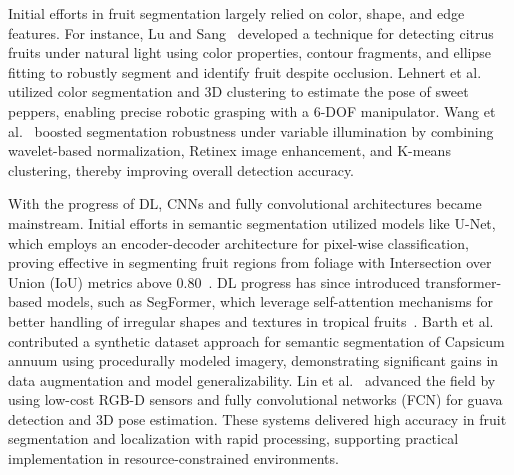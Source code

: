 \documentclass[a4paper,fleqn]{cas-dc}
\begin{document}
Initial efforts in fruit segmentation largely relied on color, shape, and edge features.
For instance, Lu and Sang~\cite{lu2015detecting} developed a technique for detecting citrus fruits under natural light using color properties, contour fragments, and ellipse fitting to robustly segment and identify fruit despite occlusion. 
Lehnert et al.~\cite{lehnert2016sweet} utilized color segmentation and 3D clustering to estimate the pose of sweet peppers, enabling precise robotic grasping with a 6-DOF manipulator. 
Wang et al.~\cite{wang2017robust} boosted segmentation robustness under variable illumination by combining wavelet-based normalization, Retinex image enhancement, and K-means clustering, thereby improving overall detection accuracy.

With the progress of DL, CNNs and fully convolutional architectures became mainstream. Initial efforts in semantic segmentation utilized models like U-Net, which employs an encoder-decoder architecture for pixel-wise classification, proving effective in segmenting fruit regions from foliage with Intersection over Union (IoU) metrics above 0.80~\cite{ronneberger2015u}. DL progress has since introduced transformer-based models, such as SegFormer, which leverage self-attention mechanisms for better handling of irregular shapes and textures in tropical fruits~\cite{xie2021segformer}. 
Barth et al.~\cite{barth2018data} contributed a synthetic dataset approach for semantic segmentation of Capsicum annuum using procedurally modeled imagery, demonstrating significant gains in data augmentation and model generalizability.
Lin et al.~\cite{lin2020color} advanced the field by using low-cost RGB-D sensors and fully convolutional networks (FCN) for guava detection and 3D pose estimation. These systems delivered high accuracy in fruit segmentation and localization with rapid processing, supporting practical implementation in resource-constrained environments.
\end{document}
